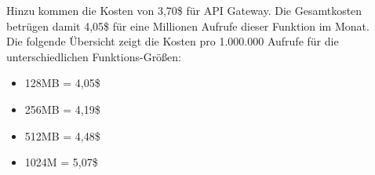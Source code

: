 Hinzu kommen die Kosten von 3,70\$ für API Gateway. Die Gesamtkosten betrügen damit 4,05\$ für eine Millionen Aufrufe dieser Funktion im Monat.    \\

Die folgende Übersicht zeigt die Kosten pro 1.000.000 Aufrufe für die unterschiedlichen Funktions-Größen:
\begin{itemize}
    \item 128MB = 4,05\$
    \item 256MB = 4,19\$
    \item 512MB = 4,48\$
    \item 1024M = 5,07\$
\end{itemize}
